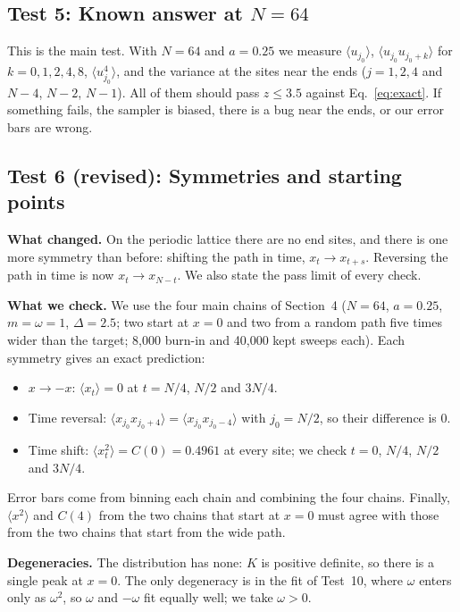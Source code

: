 \documentclass[11pt]{article}
\begin{document}
\subsection*{Test 5: Known answer at $N = 64$}
This is the main test. With $N = 64$ and $a = 0.25$ we measure $\langle u_{j_0}\rangle$, $\langle u_{j_0}u_{j_0+k}\rangle$ for $k = 0, 1, 2, 4, 8$, $\langle u_{j_0}^4\rangle$, and the variance at the sites near the ends ($j = 1, 2, 4$ and $N-4$, $N-2$, $N-1$). All of them should pass $z \le 3.5$ against Eq.~\eqref{eq:exact}. If something fails, the sampler is biased, there is a bug near the ends, or our error bars are wrong.

\subsection*{Test 6 (revised): Symmetries and starting points}

\textbf{What changed.} On the periodic lattice there are no end sites, and there
is one more symmetry than before: shifting the path in time,
$x_t\to x_{t+s}$. Reversing the path in time is now $x_t\to x_{N-t}$. We also
state the pass limit of every check.

\textbf{What we check.} We use the four main chains of Section~4 ($N=64$,
$a=0.25$, $m=\omega=1$, $\Delta=2.5$; two start at $x=0$ and two from a random
path five times wider than the target; 8{,}000 burn-in and 40{,}000 kept sweeps
each). Each symmetry gives an exact prediction:
\begin{itemize}
\item $x\to-x$: $\langle x_t\rangle=0$ at $t=N/4$, $N/2$ and $3N/4$.
\item Time reversal: $\langle x_{j_0}x_{j_0+4}\rangle=\langle x_{j_0}x_{j_0-4}\rangle$
  with $j_0=N/2$, so their difference is 0.
\item Time shift: $\langle x_t^2\rangle=C(0)=0.4961$ at every site; we check
  $t=0$, $N/4$, $N/2$ and $3N/4$.
\end{itemize}
Error bars come from binning each chain and combining the four chains. Finally,
$\langle x^2\rangle$ and $C(4)$ from the two chains that start at $x=0$ must
agree with those from the two chains that start from the wide path.

\textbf{Degeneracies.} The distribution has none: $K$ is positive definite, so
there is a single peak at $x=0$. The only degeneracy is in the fit of Test~10,
where $\omega$ enters only as $\omega^2$, so $\omega$ and $-\omega$ fit equally
well; we take $\omega>0$.
\end{document}
